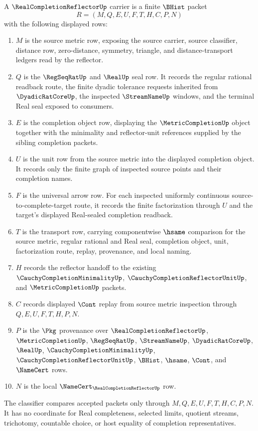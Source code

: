 \begin{definition}
\label{def:real-completion-reflector-carrier}
A $\RealCompletionReflectorUp$ carrier is a finite $\BHist$ packet
$$
R=(M,Q,E,U,F,T,H,C,P,N)
$$
with the following displayed rows:
\begin{enumerate}
\item $M$ is the source metric row, exposing the source carrier, source classifier, distance row, zero-distance, symmetry, triangle, and distance-transport ledgers read by the reflector.
\item $Q$ is the $\RegSeqRatUp$ and $\RealUp$ seal row. It records the regular rational readback route, the finite dyadic tolerance requests inherited from $\DyadicRatCoreUp$, the inspected $\StreamNameUp$ windows, and the terminal Real seal exposed to consumers.
\item $E$ is the completion object row, displaying the $\MetricCompletionUp$ object together with the minimality and reflector-unit references supplied by the sibling completion packets.
\item $U$ is the unit row from the source metric into the displayed completion object. It records only the finite graph of inspected source points and their completion names.
\item $F$ is the universal arrow row. For each inspected uniformly continuous source-to-complete-target route, it records the finite factorization through $U$ and the target's displayed Real-sealed completion readback.
\item $T$ is the transport row, carrying componentwise $\hsame$ comparison for the source metric, regular rational and Real seal, completion object, unit, factorization route, replay, provenance, and local naming.
\item $H$ records the reflector handoff to the existing $\CauchyCompletionMinimalityUp$, $\CauchyCompletionReflectorUnitUp$, and $\MetricCompletionUp$ packets.
\item $C$ records displayed $\Cont$ replay from source metric inspection through $Q,E,U,F,T,H,P,N$.
\item $P$ is the $\Pkg$ provenance over $\RealCompletionReflectorUp$, $\MetricCompletionUp$, $\RegSeqRatUp$, $\StreamNameUp$, $\DyadicRatCoreUp$, $\RealUp$, $\CauchyCompletionMinimalityUp$, $\CauchyCompletionReflectorUnitUp$, $\BHist$, $\hsame$, $\Cont$, and $\NameCert$ rows.
\item $N$ is the local $\NameCert_{\RealCompletionReflectorUp}$ row.
\end{enumerate}
The classifier compares accepted packets only through $M,Q,E,U,F,T,H,C,P,N$. It has no coordinate for Real completeness, selected limits, quotient streams, trichotomy, countable choice, or host equality of completion representatives.
\end{definition}

